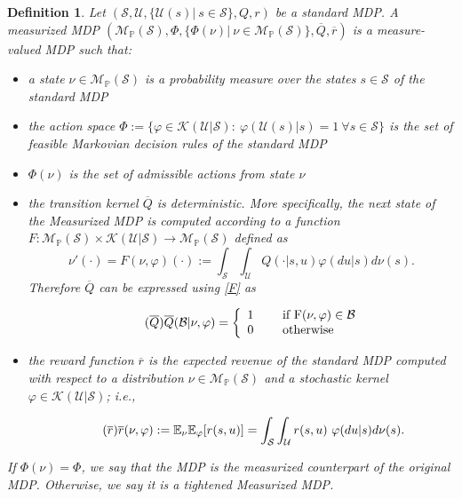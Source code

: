 \documentclass[12pt,a4paper]{article}
\newtheorem{definition}{Definition}
\newcommand{\mS}{\mathcal{S}}
\newcommand{\mU}{\mathcal{U}}
\newcommand{\mMpS}{\mathcal{M}_{\mathbb{P}}(\mathcal{S})}
\newcommand{\ovr}{\overline{r}}
\begin{document}
\begin{definition}\label{def:measurizedMDP}
Let $(\mathcal{S},\mathcal{U},\{\mathcal{U}(s)| \ s \in \mathcal{S}\},Q,r)$ be a standard MDP. A {\it measurized} MDP $(\mMpS,\Phi,\{\Phi(\nu)| \ \nu \in \mMpS\},\overline{Q},\ovr)$ is a measure-valued MDP such that:
\begin{itemize}
\item[(i)] a state $\nu \in \mMpS$ is a probability measure over the states $s\in \mS$ of the standard MDP
\item[(ii)] the action space $\Phi:=\{ \varphi \in \mathcal{K}(\mU|\mS): \ \varphi(\mU(s)|s)=1 \ \forall s \in \mS\}$ is the set of feasible Markovian decision rules of the standard MDP
\item[(iii)] $\Phi(\nu)$ is the set of admissible actions from state $\nu$
\item[(iv)] the transition kernel $\overline{Q}$ is deterministic. More specifically, the next state of the Measurized MDP is computed according to a function $F: \mMpS \times \mathcal{K}(\mU|\mS) \rightarrow \mMpS$ defined as
\begin{equation}\label{F}\tag{F}
\nu'(\cdot)=F(\nu,\varphi)(\cdot):=  \int_{\mathcal{S}}  \int_{\mathcal{U}}Q(\cdot|s,u) \varphi(du|s) d\nu(s). 
\end{equation}
%
Therefore $\overline{Q}$ can be expressed using \eqref{F} as

\begin{equation}\label{Qmu}\tag{$\overline{Q}$}
\overline{Q}(\mathcal{B}|\nu,\varphi)=\left\{ 
\begin{array}{ll}
1 & \quad \mbox{ if F$(\nu,\varphi)\in \mathcal{B}$}\\
0 & \quad \mbox{ otherwise}\\
\end{array}
\right.
\end{equation}
\item[(v)] the reward function $\ovr$ is the expected revenue of the standard MDP computed with respect to a distribution $\nu \in \mMpS$ and a stochastic kernel $\varphi \in \mathcal{K}(\mU|\mS)$; i.e.,

\begin{equation}\label{R} \tag{$\ovr$}
\ovr(\nu,\varphi):=\mathbb{E}_{\nu}\mathbb{E}_{\varphi} [r(s,u)]= \int_{\mathcal{S}} \int_{\mathcal{U}}   r(s,u) \ \varphi(du|s) d\nu(s).\\
\end{equation}
\end{itemize}

If $\Phi(\nu)=\Phi$, we say that the MDP is the measurized counterpart of the original MDP. Otherwise, we say it is a {\it tightened} Measurized MDP.\\
\end{definition}
\end{document}
